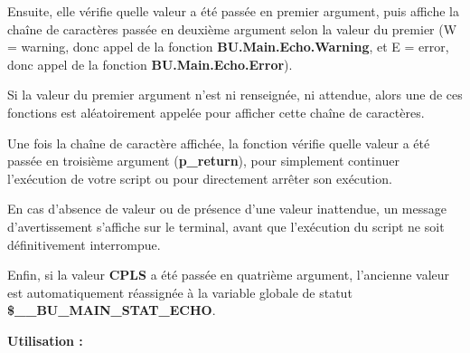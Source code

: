 \documentclass[a4paper,10pt]{article}
\begin{document}
    \begin{justify}
        Ensuite, elle vérifie quelle valeur a été passée en premier argument, puis affiche la chaîne de caractères passée en deuxième argument selon la valeur du premier (W = warning, donc appel de la fonction \textbf{\color{func}BU.Main.Echo.Warning}, et E = error, donc appel de la fonction \textbf{\color{func}BU.Main.Echo.Error}).
    \end{justify}

    \begin{justify}
        Si la valeur du premier argument n'est ni renseignée, ni attendue, alors une de ces fonctions est aléatoirement appelée pour afficher cette chaîne de caractères.
    \end{justify}

    \begin{justify}
        Une fois la chaîne de caractère affichée, la fonction vérifie quelle valeur a été passée en troisième argument (\textbf{\color{vars}p\_return}), pour simplement continuer l'exécution de votre script ou pour directement arrêter son exécution.
    \end{justify}

    \begin{justify}
        En cas d'absence de valeur ou de présence d'une valeur inattendue, un message d'avertissement s'affiche sur le terminal, avant que l'exécution du script ne soit définitivement interrompue.
    \end{justify}

    \begin{justify}
        Enfin, si la valeur \textbf{CPLS} a été passée en quatrième argument, l'ancienne valeur est automatiquement réassignée à la variable globale de statut \textbf{\color{vars}\$\_\_BU\_MAIN\_STAT\_ECHO}.
    \end{justify}

    \begin{justify}
        \textbf{Utilisation :}
    \end{justify}
\end{document}

